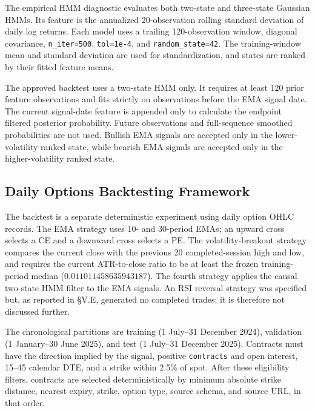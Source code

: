 \documentclass[journal]{IEEEtran}
\begin{document}
The empirical HMM diagnostic evaluates both two-state and three-state Gaussian HMMs. Its feature is the annualized 20-observation rolling standard deviation of daily log returns. Each model uses a trailing 120-observation window, diagonal covariance, \texttt{n\_iter=500}, \texttt{tol=1e-4}, and \texttt{random\_state=42}. The training-window mean and standard deviation are used for standardization, and states are ranked by their fitted feature means.

The approved backtest uses a two-state HMM only. It requires at least 120 prior feature observations and fits strictly on observations before the EMA signal date. The current signal-date feature is appended only to calculate the endpoint filtered posterior probability. Future observations and full-sequence smoothed probabilities are not used. Bullish EMA signals are accepted only in the lower-volatility ranked state, while bearish EMA signals are accepted only in the higher-volatility ranked state.

\subsection{Daily Options Backtesting Framework}

The backtest is a separate deterministic experiment using daily option OHLC records. The EMA strategy uses 10- and 30-period EMAs; an upward cross selects a CE and a downward cross selects a PE. The volatility-breakout strategy compares the current close with the previous 20 completed-session high and low, and requires the current ATR-to-close ratio to be at least the frozen training-period median ($0.011011458635943187$). The fourth strategy applies the causal two-state HMM filter to the EMA signals. An RSI reversal strategy was specified but, as reported in §V.E, generated no completed trades; it is therefore not discussed further.

The chronological partitions are training (1 July--31 December 2024), validation (1 January--30 June 2025), and test (1 July--31 December 2025). Contracts must have the direction implied by the signal, positive \texttt{contracts} and open interest, 15--45 calendar DTE, and a strike within 2.5\% of spot. After these eligibility filters, contracts are selected deterministically by minimum absolute strike distance, nearest expiry, strike, option type, source schema, and source URL, in that order.
\end{document}
